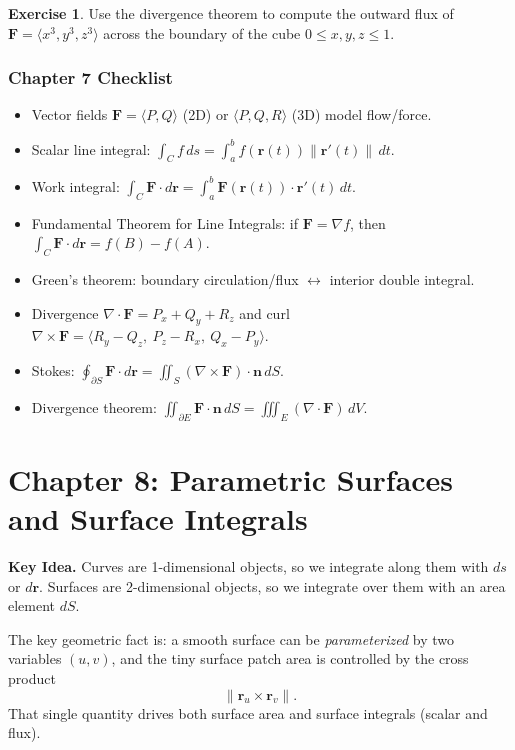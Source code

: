 \documentclass[12pt]{article}
\numberwithin{equation}{section}
\newcommand{\vect}[1]{\boldsymbol{#1}}   %
\theoremstyle{plain}
\theoremstyle{definition}
\newtheorem{exercise}[theorem]{Exercise}
\theoremstyle{remark}
\newenvironment{keyidea}{\begin{tcolorbox}\textbf{Key Idea.}}{\end{tcolorbox}}
\begin{document}
\begin{exercise}
Use the divergence theorem to compute the outward flux of $\vect F=\langle x^3,y^3,z^3\rangle$ across the boundary of the cube $0\le x,y,z\le 1$.
\end{exercise}

\subsubsection*{Chapter 7 Checklist}
\begin{itemize}
\item Vector fields $\vect F=\langle P,Q\rangle$ (2D) or $\langle P,Q,R\rangle$ (3D) model flow/force.
\item Scalar line integral: $\displaystyle \int_C f\,ds=\int_a^b f(\vect r(t))\|\vect r'(t)\|\,dt$.
\item Work integral: $\displaystyle \int_C \vect F\cdot d\vect r=\int_a^b \vect F(\vect r(t))\cdot \vect r'(t)\,dt$.
\item Fundamental Theorem for Line Integrals: if $\vect F=\nabla f$, then $\int_C \vect F\cdot d\vect r=f(B)-f(A)$.
\item Green's theorem: boundary circulation/flux $\leftrightarrow$ interior double integral.
\item Divergence $\nabla\cdot \vect F=P_x+Q_y+R_z$ and curl $\nabla\times \vect F=\langle R_y-Q_z,\ P_z-R_x,\ Q_x-P_y\rangle$.
\item Stokes: $\displaystyle \oint_{\partial S} \vect F\cdot d\vect r=\iint_S (\nabla\times \vect F)\cdot \vect n\,dS$.
\item Divergence theorem: $\displaystyle \iint_{\partial E}\vect F\cdot \vect n\,dS=\iiint_E (\nabla\cdot \vect F)\,dV$.
\end{itemize}



\section{Chapter 8: Parametric Surfaces and Surface Integrals}

\begin{keyidea}
Curves are 1-dimensional objects, so we integrate along them with $ds$ or $d\vect r$.  
Surfaces are 2-dimensional objects, so we integrate over them with an area element $dS$.

The key geometric fact is: a smooth surface can be \emph{parameterized} by two variables $(u,v)$, and the tiny surface patch area is controlled by the cross product
\[
\bigl\|\vect r_u\times \vect r_v\bigr\|.
\]
That single quantity drives both surface area and surface integrals (scalar and flux).
\end{keyidea}
\end{document}
